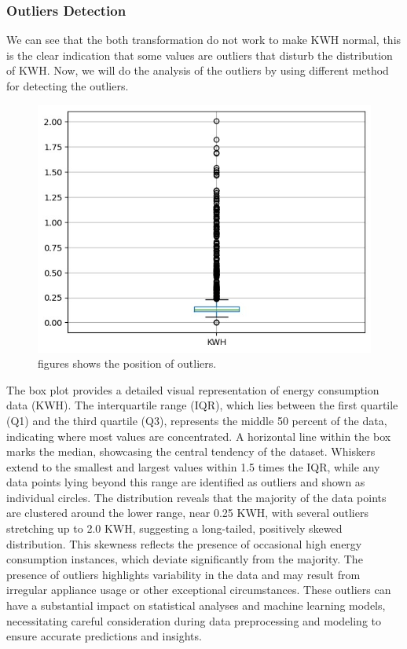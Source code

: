 \documentclass[english,12pt, titlepage]{article}
\begin{document}
	\subsubsection{Outliers Detection}
	
	We can see that the both transformation do not work to make KWH normal, this is the clear indication that some values are outliers that disturb the distribution of KWH. Now, we will do the analysis of the outliers by using different method for detecting the outliers. 
	
	\begin{figure}[!ht]
		\centering
		\includegraphics[width=0.6\linewidth]{fig4.jpeg}
		\caption{figures shows the position of outliers.}\label{fig5}
	\end{figure}
	
	The box plot provides a detailed visual representation of energy consumption data (KWH). The interquartile range (IQR), which lies between the first quartile (Q1) and the third quartile (Q3), represents the middle 50 percent of the data, indicating where most values are concentrated. A horizontal line within the box marks the median, showcasing the central tendency of the dataset. Whiskers extend to the smallest and largest values within 1.5 times the IQR, while any data points lying beyond this range are identified as outliers and shown as individual circles. The distribution reveals that the majority of the data points are clustered around the lower range, near 0.25 KWH, with several outliers stretching up to 2.0 KWH, suggesting a long-tailed, positively skewed distribution. This skewness reflects the presence of occasional high energy consumption instances, which deviate significantly from the majority. The presence of outliers highlights variability in the data and may result from irregular appliance usage or other exceptional circumstances. These outliers can have a substantial impact on statistical analyses and machine learning models, necessitating careful consideration during data preprocessing and modeling to ensure accurate predictions and insights.
	
\end{document}
